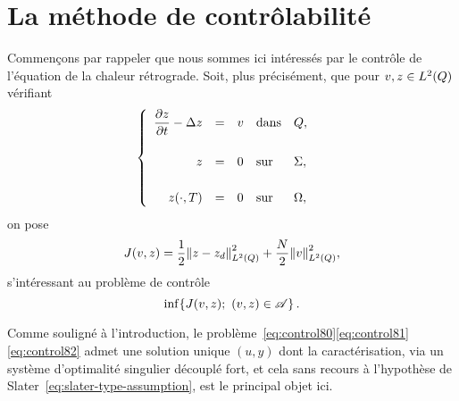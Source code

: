\section{La méthode de contrôlabilité}\label{sec:controlproblem}

Commençons par rappeler que nous sommes ici intéressés par le contrôle de
l'équation de la chaleur rétrograde. Soit, plus précisément, que pour
$v,z\in L^{2}\!\left({Q}\right)$ vérifiant
\begin{equation}\label{eq:control80}
    \begin{cases}\displaystyle
        \begin{array}{rclll}
            \dfrac{\partial{}z}{\partial{}t} - \Delta z & = & v & \text{dans} & Q,\\
            \\
            z & = & 0 & \text{sur} & \Sigma,\\
            \\
            {z}\!\left({\cdot,T}\right) & = & 0 & \text{sur} & \Omega,
        \end{array}
    \end{cases}
\end{equation}
on pose
\begin{equation}\label{eq:control81}
    J(v,z) = \dfrac{1}{2}{\left\|{z - z_{d} }\right\|}_{L^{2}\left({Q}\right)}^{2} + \dfrac{N}{2}{\left\|{v }\right\|}_{L^{2}\left({Q}\right)}^{2},
\end{equation}
s'intéressant au problème de contrôle
\begin{equation}\label{eq:control82}
    \inf\!\left\{{%
        J(v,z);\ (v,z)\in\Ascr
    }\right\}.
\end{equation}

Comme souligné à l'introduction, le
problème~\eqref{eq:control80}\eqref{eq:control81}\eqref{eq:control82} admet
une solution unique $(u,y)$ dont la caractérisation, via un système
d'optimalité singulier découplé fort, et cela sans recours à l'hypothèse de
Slater~\eqref{eq:slater-type-assumption}, est le principal objet ici.


